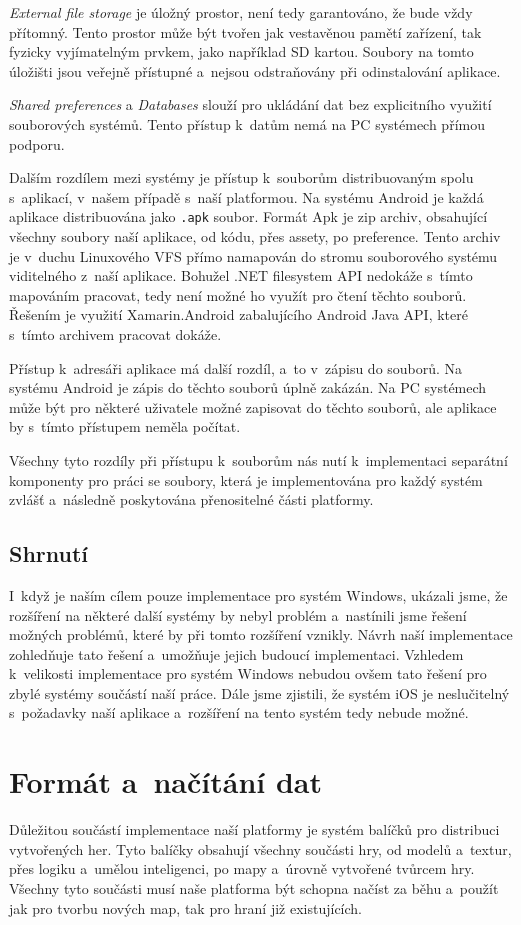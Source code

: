 \textit{External file storage} je   úložný prostor, není tedy garantováno, že bude vždy přítomný. Tento prostor může být tvořen jak vestavěnou pamětí zařízení, tak fyzicky vyjímatelným prvkem, jako například SD kartou. Soubory na tomto úložišti jsou veřejně přístupné a~nejsou odstraňovány při odinstalování aplikace. 

\textit{Shared preferences} a \textit{Databases} slouží pro ukládání dat bez explicitního využití souborových systémů. Tento přístup k~datům nemá na PC systémech přímou podporu.


Dalším rozdílem mezi systémy je přístup k~souborům distribuovaným spolu s~aplikací, v~našem případě s~naší platformou. Na systému Android je každá aplikace distribuována jako \texttt{.apk} soubor. Formát Apk je zip archiv, obsahující všechny soubory naší aplikace, od kódu, přes assety, po preference. Tento archiv je v~duchu Linuxového VFS přímo namapován do stromu souborového systému viditelného z~naší aplikace. Bohužel .NET filesystem API nedokáže s~tímto mapováním pracovat, tedy není možné ho využít pro čtení těchto souborů. Řešením je využití Xamarin.Android zabalujícího Android Java API, které s~tímto archivem pracovat dokáže.

Přístup k~adresáři aplikace má další rozdíl, a~to v~zápisu do souborů. Na systému Android je zápis do těchto souborů úplně zakázán. Na PC systémech může být pro některé uživatele možné zapisovat do těchto souborů, ale aplikace by s~tímto přístupem neměla počítat.

Všechny tyto rozdíly při přístupu k~souborům nás nutí k~implementaci separátní komponenty pro práci se soubory, která je implementována pro každý systém zvlášť a~následně poskytována přenositelné části platformy.

\subsection{Shrnutí}
I~když je naším cílem pouze implementace pro systém Windows, ukázali jsme, že rozšíření na některé další systémy by nebyl problém a~nastínili jsme řešení možných problémů, které by při tomto rozšíření vznikly. Návrh naší implementace zohledňuje tato řešení a~umožňuje jejich  budoucí implementaci. Vzhledem k~velikosti implementace pro systém Windows nebudou ovšem tato řešení pro zbylé systémy součástí naší práce. Dále jsme zjistili, že systém iOS je neslučitelný s~požadavky naší aplikace a~rozšíření na tento systém tedy nebude možné.

\section{Formát a~načítání dat}
Důležitou součástí implementace naší platformy je systém balíčků pro distribuci vytvořených her. Tyto balíčky obsahují všechny součásti hry, od modelů a~textur, přes logiku a~umělou inteligenci, po mapy a~úrovně vytvořené tvůrcem hry. Všechny tyto součásti musí naše platforma být schopna načíst za běhu a~použít jak pro tvorbu nových map, tak pro hraní již existujících.

